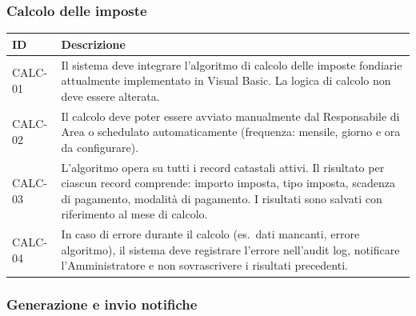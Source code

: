 \documentclass[12pt, a4paper]{article}
\begin{document}
\subsubsection{Calcolo delle imposte}

\begin{longtable}{@{}p{2.5cm}p{9.5cm}@{}}
  \toprule
  \textbf{ID} & \textbf{Descrizione} \\
  \midrule
  \endhead

  CALC-01 &
  Il sistema deve integrare l'algoritmo di calcolo delle imposte fondiarie attualmente
  implementato in Visual Basic. La logica di calcolo non deve essere alterata. \\[6pt]

  CALC-02 &
  Il calcolo deve poter essere avviato manualmente dal Responsabile di Area o schedulato
  automaticamente (frequenza: mensile, giorno e ora da configurare). \\[6pt]

  CALC-03 &
  L'algoritmo opera su tutti i record catastali attivi. Il risultato per ciascun record
  comprende: importo imposta, tipo imposta, scadenza di pagamento, modalità di pagamento.
  I risultati sono salvati con riferimento al mese di calcolo. \\[6pt]

  CALC-04 &
  In caso di errore durante il calcolo (es.\ dati mancanti, errore algoritmo), il sistema
  deve registrare l'errore nell'audit log, notificare l'Amministratore e non sovrascrivere
  i risultati precedenti. \\

  \bottomrule
\end{longtable}

\subsubsection{Generazione e invio notifiche}
\end{document}
